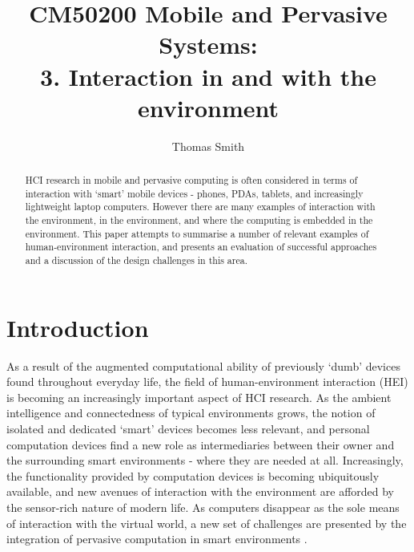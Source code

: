 \documentclass[oribibl,11pt]{llncs}
\begin{document}
\title{CM50200 Mobile and Pervasive Systems:\\3. Interaction in and with the environment}


\author{Thomas Smith}
\maketitle

\begin{abstract}
HCI research in mobile and pervasive computing is often considered in terms of interaction with `smart' mobile devices - phones, PDAs, tablets, and increasingly lightweight laptop computers. However there are many examples of interaction with the environment, in the environment, and where the computing is embedded in the environment. This paper attempts to summarise a number of relevant examples of human-environment interaction, and presents an evaluation of successful approaches and a discussion of the design challenges in this area.
\end{abstract}

\section{Introduction}

As a result of the augmented computational ability of previously `dumb' devices found throughout everyday life, the field of human-environment interaction (HEI) is becoming an increasingly important aspect of HCI research. As the ambient intelligence and connectedness of typical environments grows, the notion of isolated and dedicated `smart' devices becomes less relevant, and personal computation devices find a new role as intermediaries between their owner and the surrounding smart environments - where they are needed at all. Increasingly, the functionality provided by computation devices is becoming ubiquitously available, and new avenues of interaction with the environment are afforded by the sensor-rich nature of modern life. As computers disappear as the sole means of interaction with the virtual world, a new set of challenges are presented by the integration of pervasive computation in smart environments \cite{Streitz:2006:HIH:1783789.1783791}.
\end{document}
